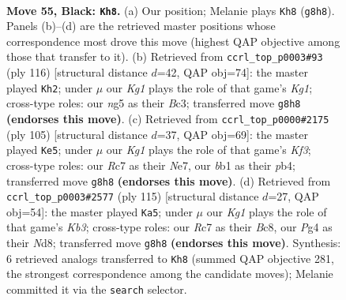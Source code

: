 \documentclass[11pt]{article}
\begin{document}
\clearpage

\begin{figure}[p]\centering
\begin{subfigure}{0.46\textwidth}\centering
\resizebox{\linewidth}{!}{%
\newchessgame
\chessboard[
  setfen={6k1/2r2p1p/b5p1/4P1N1/1n3Pp1/8/5K1P/1B6 b - - 1 55},
  showmover=false,
  pgfstyle=straightmove, color=movearrow, markmove={g8-h8}
]}
\caption{}
\end{subfigure}\hfill
\begin{subfigure}{0.46\textwidth}\centering
\resizebox{\linewidth}{!}{%
\newchessgame
\chessboard[
  setfen={8/1b3k2/5p2/1p5N/p1n4p/P1B4P/1P4P1/6K1 w - - 4 59},
  showmover=false,
  pgfstyle=straightmove, color=movearrow, markmove={g1-h2}
]}
\caption{}
\end{subfigure}
\\[4pt]
\begin{subfigure}{0.46\textwidth}\centering
\resizebox{\linewidth}{!}{%
\newchessgame
\chessboard[
  setfen={8/4n3/p1p2k2/1pP2p2/1P1N4/P3K1P1/8/8 b - - 2 53},
  showmover=false,
  pgfstyle=straightmove, color=movearrow, markmove={f6-e5}
]}
\caption{}
\end{subfigure}\hfill
\begin{subfigure}{0.46\textwidth}\centering
\resizebox{\linewidth}{!}{%
\newchessgame
\chessboard[
  setfen={2bn4/8/1k2p2p/1p2P1p1/3N2P1/P3K2P/B7/8 b - - 6 58},
  showmover=false,
  pgfstyle=straightmove, color=movearrow, markmove={b6-a5}
]}
\caption{}
\end{subfigure}
\caption{\textbf{Move 55, Black: \texttt{Kh8}.} (a) Our position; Melanie plays \texttt{Kh8} (\texttt{g8h8}). Panels (b)--(d) are the retrieved master positions whose correspondence most drove this move (highest QAP objective among those that transfer to it). (b) Retrieved from \texttt{ccrl\_top\_p0003\#93} (ply 116) [structural distance $d$=42, QAP obj=74]: the master played \texttt{Kh2}; under $\mu$ our \emph{Kg1} plays the role of that game's \emph{Kg1}; cross-type roles: our \emph{n}g5 as their \emph{B}c3; transferred move \texttt{g8h8} \textbf{(endorses this move)}. (c) Retrieved from \texttt{ccrl\_top\_p0000\#2175} (ply 105) [structural distance $d$=37, QAP obj=69]: the master played \texttt{Ke5}; under $\mu$ our \emph{Kg1} plays the role of that game's \emph{Kf3}; cross-type roles: our \emph{R}c7 as their \emph{N}e7, our \emph{b}b1 as their \emph{p}b4; transferred move \texttt{g8h8} \textbf{(endorses this move)}. (d) Retrieved from \texttt{ccrl\_top\_p0003\#2577} (ply 115) [structural distance $d$=27, QAP obj=54]: the master played \texttt{Ka5}; under $\mu$ our \emph{Kg1} plays the role of that game's \emph{Kb3}; cross-type roles: our \emph{R}c7 as their \emph{B}c8, our \emph{P}g4 as their \emph{N}d8; transferred move \texttt{g8h8} \textbf{(endorses this move)}. Synthesis: 6 retrieved analogs transferred to \texttt{Kh8} (summed QAP objective 281, the strongest correspondence among the candidate moves); Melanie committed it via the \texttt{search} selector.}
\label{fig:thought-m109}
\end{figure}
\end{document}
